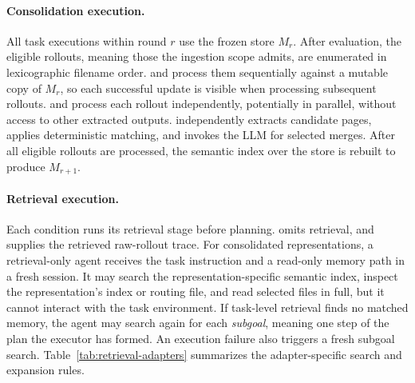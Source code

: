 \paragraph{Consolidation execution.}
All task executions within round $r$ use the frozen store $M_r$. After
evaluation, the eligible rollouts, meaning those the ingestion scope
admits, are enumerated in lexicographic filename order.
 and  process them sequentially against a mutable copy of
$M_r$, so each successful update is visible when processing subsequent
rollouts.  and  process each rollout independently, potentially
in parallel, without access to other extracted outputs. 
independently extracts candidate pages, applies deterministic matching, and
invokes the LLM for selected merges. After all eligible rollouts are processed,
the semantic index over the store is rebuilt to produce $M_{r+1}$.

\paragraph{Retrieval execution.}
Each condition runs its retrieval stage before planning.  omits
retrieval, and  supplies the retrieved
raw-rollout trace. For
consolidated representations, a retrieval-only agent receives the task
instruction and a read-only memory path in a fresh session. It may search the
representation-specific semantic index, inspect the representation's index or
routing file, and read selected files in full, but it cannot interact with the
task environment. If task-level retrieval finds no matched memory, the agent
may search again for each \emph{subgoal}, meaning one step of the plan
the executor has formed. An execution failure also
triggers a fresh subgoal search. Table~\ref{tab:retrieval-adapters} summarizes the
adapter-specific search and expansion rules.


